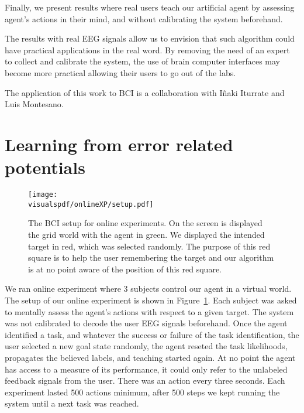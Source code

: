 Finally, we present results where real users teach our artificial agent by assessing agent's actions in their mind, and without calibrating the system beforehand.

The results with real EEG signals allow us to envision that such algorithm could have practical applications in the real word. By removing the need of an expert to collect and calibrate the system, the use of brain computer interfaces may become more practical allowing their users to go out of the labs.

The application of this work to BCI is a collaboration with I{\~n}aki Iturrate and Luis Montesano.

\section{Learning from error related potentials}
\label{chapter:bci:setupandeeg}


\begin{figure}[!htbp]
\centering
\texttt{[image: \\visualspdf/onlineXP/setup.pdf]}
\caption{The BCI setup for online experiments. On the screen is displayed the grid world with the agent in green. We displayed the intended target in red, which was selected randomly. The purpose of this red square is to help the user remembering the target and our algorithm is at no point aware of the position of this red square.}
\label{fig:BCIsetup}
\end{figure}

We ran online experiment where 3 subjects  control our agent in a virtual world. The setup of our online experiment is shown in Figure~\ref{fig:BCIsetup}. Each subject was asked to mentally assess the agent's actions with respect to a given target. The system was not calibrated to decode the user EEG signals beforehand. Once the agent identified a task, and whatever the success or failure of the task identification, the user selected a new goal state randomly, the agent reseted the task likelihoods, propagates the believed labels, and teaching started again. At no point the agent has access to a measure of its performance, it could only refer to the unlabeled feedback signals from the user. There was an action every three seconds. Each experiment lasted 500 actions minimum, after 500 steps we kept running the system until a next task was reached.


